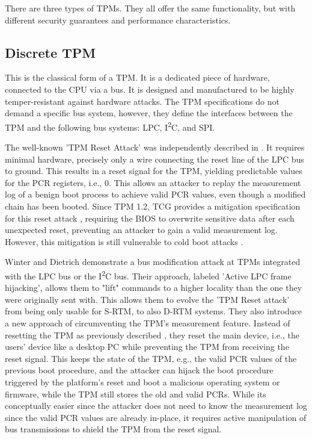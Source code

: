 There are three types of TPMs. They all offer the same functionality, but with different security guarantees and performance characteristics.

\subsection{Discrete TPM}

This is the classical form of a TPM. It is a dedicated piece of hardware, connected to the CPU via a bus. It is designed and manufactured to be highly temper-resistant against hardware attacks.
The TPM specifications \cite{tpm, tcgPcClient} do not demand a specific bus system, however, they define the interfaces between the TPM and the following bus systems: LPC, I\textsuperscript{2}C, and SPI.

The well-known 'TPM Reset Attack' was independently described in \cite{kauerBernhard,sparks2007}. It requires minimal hardware, precisely only a wire connecting the reset line of the LPC bus \cite{lpc} to ground. This results in a reset signal for the TPM, yielding predictable values for the PCR registers, i.e., 0. This allows an attacker to replay the measurement log of a benign boot process to achieve valid PCR values, even though a modified chain has been booted.
Since TPM 1.2, TCG provides a mitigation specification for this reset attack \cite{tcgResetFix}, requiring the BIOS to overwrite sensitive data after each unexpected reset, preventing an attacker to gain a valid measurement log.
However, this mitigation is still vulnerable to cold boot attacks \cite{Halderman2009, Winter2013}.

Winter and Dietrich \cite{Winter2013} demonstrate a bus modification attack at TPMs integrated with the LPC bus or the I\textsuperscript{2}C bus.
Their approach, labeled 'Active LPC frame hijacking', allows them to "lift" commands to a higher locality than the one they were originally sent with. This allows them to evolve the 'TPM Reset attack' from being only usable for S-RTM, to also D-RTM systems.
They also introduce a new approach of circumventing the TPM's measurement feature. Instead of resetting the TPM as previously described \cite{kauerBernhard,sparks2007}, they reset the main device, i.e., the users' device like a desktop PC while preventing the TPM from receiving the reset signal. This keeps the state of the TPM, e.g., the valid PCR values of the previous boot procedure, and the attacker can hijack the boot procedure triggered by the platform's reset and boot a malicious operating system or firmware, while the TPM still stores the old and valid PCRs. While its conceptually easier since the attacker does not need to know the measurement log since the valid PCR values are already in-place, it requires active manipulation of bus transmissions to shield the TPM from the reset signal.

